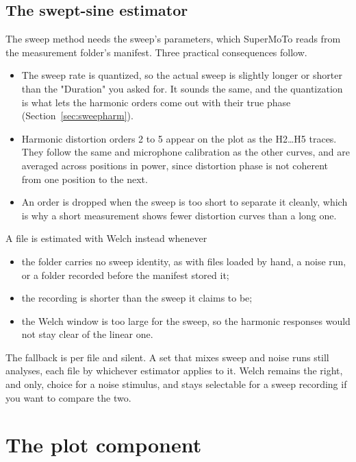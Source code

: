 \subsection{The swept-sine estimator}\label{sec:sweep}
The sweep method needs the sweep's parameters, which SuperMoTo reads from the measurement folder's manifest. Three practical consequences follow.

\begin{itemize}[nosep]
  \item The sweep rate is quantized, so the actual sweep is slightly longer or shorter than the "Duration" you asked for. It sounds the same, and the quantization is what lets the harmonic orders come out with their true phase (Section~\ref{sec:sweepharm}).
  \item Harmonic distortion orders 2 to 5 appear on the plot as the H2\ldots{}H5 traces. They follow the same  and microphone calibration as the other curves, and are averaged across positions in power, since distortion phase is not coherent from one position to the next.
  \item An order is dropped when the sweep is too short to separate it cleanly, which is why a short measurement shows fewer distortion curves than a long one.
\end{itemize}

\noindent A file is estimated with Welch instead whenever

\begin{itemize}[nosep]
  \item the folder carries no sweep identity, as with files loaded by hand, a noise run, or a folder recorded before the manifest stored it;
  \item the recording is shorter than the sweep it claims to be;
  \item the Welch window is too large for the sweep, so the harmonic responses would not stay clear of the linear one.
\end{itemize}

\noindent The fallback is per file and silent. A set that mixes sweep and noise runs still analyses, each file by whichever estimator applies to it. Welch remains the right, and only, choice for a noise stimulus, and stays selectable for a sweep recording if you want to compare the two.

\section{The plot component}

